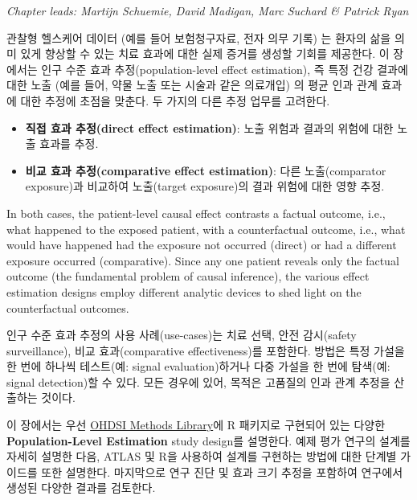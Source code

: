 \documentclass[11pt]{book}
\providecommand{\tightlist}{%
  \setlength{\itemsep}{0pt}\setlength{\parskip}{0pt}}
\theoremstyle{definition}
\theoremstyle{definition}
\theoremstyle{definition}
\theoremstyle{remark}
\begin{document}
\emph{Chapter leads: Martijn Schuemie, David Madigan, Marc Suchard \&
Patrick Ryan}


관찰형 헬스케어 데이터 (예를 들어 보험청구자료, 전자 의무 기록) 는
환자의 삶을 의미 있게 향상할 수 있는 치료 효과에 대한 실제 증거를 생성할
기회를 제공한다. 이 장에서는 인구 수준 효과 추정(population-level effect
estimation), 즉 특정 건강 결과에 대한 노출 (예를 들어, 약물 노출 또는
시술과 같은 의료개입) 의 평균 인과 관계 효과에 대한 추정에 초점을
맞춘다. 두 가지의 다른 추정 업무를 고려한다.

\begin{itemize}
\tightlist
\item
  \textbf{직접 효과 추정(direct effect estimation)}: 노출 위험과 결과의
  위험에 대한 노출 효과를 추정. 
\item
  \textbf{비교 효과 추정(comparative effect estimation)}: 다른
  노출(comparator exposure)과 비교하여 노출(target exposure)의 결과
  위험에 대한 영향 추정. 
\end{itemize}

In both cases, the patient-level causal effect contrasts a factual
outcome, i.e., what happened to the exposed patient, with a
counterfactual outcome, i.e., what would have happened had the exposure
not occurred (direct) or had a different exposure occurred
(comparative). Since any one patient reveals only the factual outcome
(the fundamental problem of causal inference), the various effect
estimation designs employ different analytic devices to shed light on
the counterfactual outcomes. 

인구 수준 효과 추정의 사용 사례(use-cases)는 치료 선택, 안전 감시(safety
surveillance), 비교 효과(comparative effectiveness)를 포함한다. 방법은
특정 가설을 한 번에 하나씩 테스트(예: signal evaluation)하거나 다중
가설을 한 번에 탐색(예: signal detection)할 수 있다. 모든 경우에 있어,
목적은 고품질의 인과 관계 추정을 산출하는 것이다.

이 장에서는 우선 \href{https://ohdsi.github.io/MethodsLibrary/}{OHDSI
Methods Library}에 R 패키지로 구현되어 있는 다양한
\textbf{Population-Level Estimation} study design를 설명한다. 예제 평가
연구의 설계를 자세히 설명한 다음, ATLAS 및 R을 사용하여 설계를 구현하는
방법에 대한 단계별 가이드를 또한 설명한다. 마지막으로 연구 진단 및 효과
크기 추정을 포함하여 연구에서 생성된 다양한 결과를 검토한다.
\end{document}
